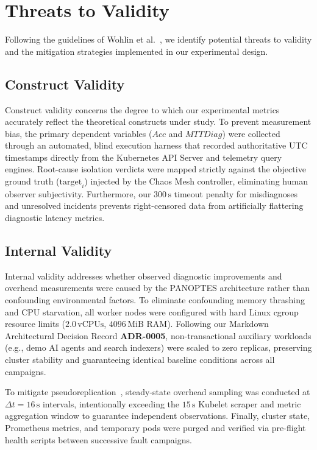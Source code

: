 \section{Threats to Validity}
\label{sec:threats_to_validity}

Following the guidelines of Wohlin et al.~\cite{wohlin_2012}, we identify potential threats to validity and the mitigation strategies implemented in our experimental design.

\subsection{Construct Validity}
Construct validity concerns the degree to which our experimental metrics accurately reflect the theoretical constructs under study. To prevent measurement bias, the primary dependent variables ($Acc$ and $MTTDiag$) were collected through an automated, blind execution harness that recorded authoritative UTC timestamps directly from the Kubernetes API Server and telemetry query engines. Root-cause isolation verdicts were mapped strictly against the objective ground truth ($\text{target}_i$) injected by the Chaos Mesh controller, eliminating human observer subjectivity. Furthermore, our $300\,\text{s}$ timeout penalty for misdiagnoses and unresolved incidents prevents right-censored data from artificially flattering diagnostic latency metrics.

\subsection{Internal Validity}
Internal validity addresses whether observed diagnostic improvements and overhead measurements were caused by the PANOPTES architecture rather than confounding environmental factors. To eliminate confounding memory thrashing and CPU starvation, all worker nodes were configured with hard Linux cgroup resource limits ($2.0\,\text{vCPUs}$, $4096\,\text{MiB}$ RAM). Following our Markdown Architectural Decision Record \textbf{ADR-0005}, non-transactional auxiliary workloads (e.g., demo AI agents and search indexers) were scaled to zero replicas, preserving cluster stability and guaranteeing identical baseline conditions across all campaigns.

To mitigate pseudoreplication~\cite{hurlbert_1984}, steady-state overhead sampling was conducted at $\Delta t = 16\,\text{s}$ intervals, intentionally exceeding the $15\,\text{s}$ Kubelet scraper and metric aggregation window to guarantee independent observations. Finally, cluster state, Prometheus metrics, and temporary pods were purged and verified via pre-flight health scripts between successive fault campaigns.

